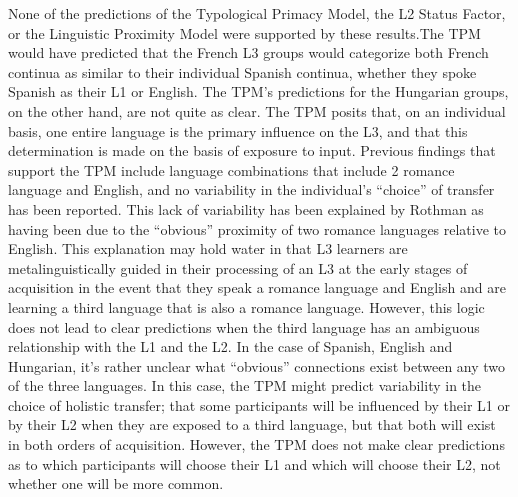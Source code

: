 \documentclass[
  english,
  man]{apa6}
\begin{document}
None of the predictions of the Typological Primacy Model, the L2 Status Factor, or the Linguistic Proximity Model were supported by these results.The TPM would have predicted that the French L3 groups would categorize both French continua as similar to their individual Spanish continua, whether they spoke Spanish as their L1 or English. The TPM's predictions for the Hungarian groups, on the other hand, are not quite as clear. The TPM posits that, on an individual basis, one entire language is the primary influence on the L3, and that this determination is made on the basis of exposure to input. Previous findings that support the TPM include language combinations that include 2 romance language and English, and no variability in the individual's \enquote{choice} of transfer has been reported. This lack of variability has been explained by Rothman as having been due to the \enquote{obvious} proximity of two romance languages relative to English. This explanation may hold water in that L3 learners are metalinguistically guided in their processing of an L3 at the early stages of acquisition in the event that they speak a romance language and English and are learning a third language that is also a romance language. However, this logic does not lead to clear predictions when the third language has an ambiguous relationship with the L1 and the L2. In the case of Spanish, English and Hungarian, it's rather unclear what \enquote{obvious} connections exist between any two of the three languages. In this case, the TPM might predict variability in the choice of holistic transfer; that some participants will be influenced by their L1 or by their L2 when they are exposed to a third language, but that both will exist in both orders of acquisition. However, the TPM does not make clear predictions as to which participants will choose their L1 and which will choose their L2, not whether one will be more common.
\end{document}
